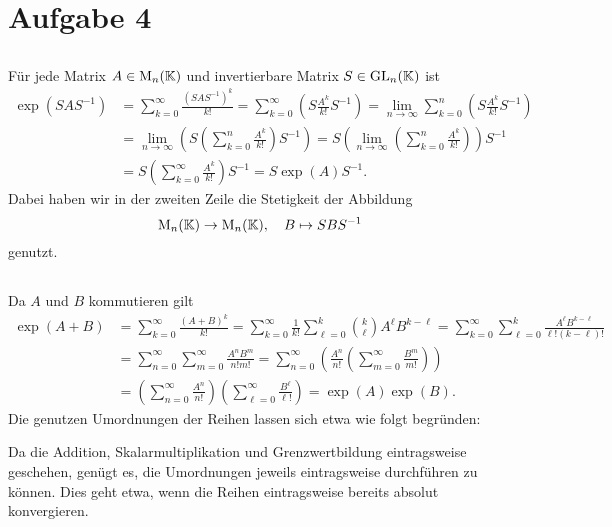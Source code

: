 \documentclass[a4paper, 10pt, numbers=noenddot]{scrartcl}
\begin{document}
\section{Aufgabe 4}





\subsection{}
Für jede Matrix $A \in \operatorname{M}_n(\mathbb{K})$ und invertierbare Matrix $S \in \operatorname{GL}_n(\mathbb{K})$ ist
\begin{align*}
      \exp(S A S^{-1})
  &=  \sum_{k=0}^\infty \frac{(S A S^{-1})^k}{k!}
   =  \sum_{k=0}^\infty \left( S \frac{A^k}{k!} S^{-1} \right)
   =  \lim_{n \to \infty} \sum_{k=0}^n \left( S \frac{A^k}{k!} S^{-1} \right) \\
  &=  \lim_{n \to \infty} \left( S \left( \sum_{k=0}^n \frac{A^k}{k!} \right) S^{-1} \right)
   =  S \left( \lim_{n \to \infty} \left( \sum_{k=0}^n \frac{A^k}{k!} \right) \right) S^{-1} \\
  &=  S \left( \sum_{k=0}^\infty \frac{A^k}{k!} \right) S^{-1}
   =  S \exp(A) S^{-1}.
\end{align*}
Dabei haben wir in der zweiten Zeile die Stetigkeit der Abbildung
\[
  \operatorname{M}_n(\mathbb{K}) \to \operatorname{M}_n(\mathbb{K}),
  \quad
  B \mapsto S B S^{-1}
\]
genutzt.





\subsection{}
Da $A$ und $B$ kommutieren gilt
\begin{align*}
      \exp(A+B)
  &=  \sum_{k=0}^\infty \frac{(A+B)^k}{k!}
   =  \sum_{k=0}^\infty \frac{1}{k!} \sum_{\ell=0}^k \binom{k}{\ell} A^\ell B^{k-\ell}
   =  \sum_{k=0}^\infty \sum_{\ell=0}^k \frac{A^\ell B^{k-\ell}}{\ell! (k-\ell)!} \\
  &=  \sum_{n=0}^\infty \sum_{m=0}^\infty \frac{A^n B^m}{n! m!}
   =  \sum_{n=0}^\infty \left( \frac{A^n}{n!} \left( \sum_{m=0}^\infty \frac{B^m}{m!} \right) \right) \\
  &=  \left( \sum_{n=0}^\infty \frac{A^n}{n!} \right) \left( \sum_{\ell=0}^\infty \frac{B^\ell}{\ell!} \right)
   =  \exp(A) \exp(B).
\end{align*}
Die genutzen Umordnungen der Reihen lassen sich etwa wie folgt begründen:

Da die Addition, Skalarmultiplikation und Grenzwertbildung eintragsweise geschehen, genügt es, die Umordnungen jeweils eintragsweise durchführen zu können.
Dies geht etwa, wenn die Reihen eintragsweise bereits absolut konvergieren.
\end{document}
